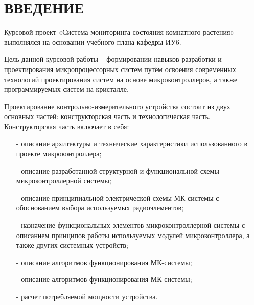 \documentclass{bmstu}
\begin{document}
    \begin{abbreviations}
    \end{abbreviations}

    \maketableofcontents

    \chapter*{ВВЕДЕНИЕ}
    Курсовой проект «Система мониторинга состояния комнатного растения» выполнялся на основании учебного плана кафедры ИУ6.

    Цель данной курсовой работы – формировании навыков разработки и проектирования микропроцессорных систем путём освоения современных технологий проектирования систем на основе микроконтроллеров, а также программируемых систем на кристалле.

    Проектирование контрольно-измерительного устройства состоит из двух основных частей: конструкторская часть и технологическая часть.
    Конструкторская часть включает в себя:
    \begin{itemize}
        \item[-] описание архитектуры и технические характеристики использованного в проекте микроконтроллера;
        \item[-] описание разработанной структурной и функциональной схемы микроконтроллерной системы;
        \item[-] описание принципиальной электрической схемы МК-системы с обоснованием выбора используемых радиоэлементов;
        \item[-] назначение функциональных элементов микроконтроллерной системы с описанием принципов работы используемых модулей микроконтроллера, а также других системных устройств;
        \item[-] описание алгоритмов функционирования МК-системы;
        \item[-] описание алгоритмов функционирования МК-системы;
        \item[-] расчет потребляемой мощности устройства.
    \end{itemize}
\end{document}
